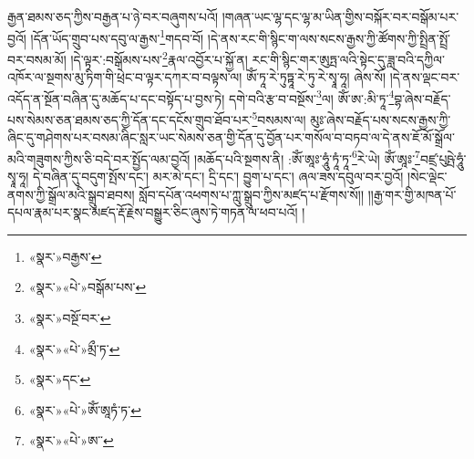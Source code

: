 རྒྱན་ཐམས་ཅད་ཀྱིས་བརྒྱན་པ་ཉེ་བར་བཞུགས་པའོ། །གཞན་ཡང་ལྷ་དང་ལྷ་མ་ཡིན་གྱིས་བསྐོར་བར་བསྒོམ་པར་བྱའོ། །དོན་ཡོད་གྲུབ་པས་དབུ་ལ་རྒྱས་\footnote{«སྣར་»བརྒྱས་}གདབ་བོ། །དེ་ནས་རང་གི་སྙིང་ག་ལས་སངས་རྒྱས་ཀྱི་ཚོགས་ཀྱི་སྤྲིན་སྤྲོ་བར་བསམ་མོ། །དེ་ལྟར་:བསྒོམས་པས་\footnote{«སྣར་»«པེ་»བསྒོམ་པས་}རྣལ་འབྱོར་པ་སྐྱོ་ན། རང་གི་སྙིང་གར་ཨུཏྤ་ལའི་སྟེང་དུ་ཟླ་བའི་དཀྱིལ་འཁོར་ལ་སྔགས་མུ་ཏིག་གི་ཕྲེང་བ་ལྟར་དཀར་བ་བལྟས་ལ། ཨོཾ་ཏཱ་རེ་ཏུཏྟཱ་རེ་ཏུ་རེ་སྭཱ་ཧཱ། ཞེས་སོ། །དེ་ནས་ལྡང་བར་འདོད་ན་སྔོན་བཞིན་དུ་མཆོད་པ་དང་བསྟོད་པ་བྱས་ཏེ། དགེ་བའི་རྩ་བ་བསྔོས་\footnote{«སྣར་»བསྔོ་བར་}ལ། ཨོཾ་ཨ་:མི་ཏཱ་\footnote{«སྣར་»«པེ་»མྲྀ་ཏ་}བྷ་ཞེས་བརྗོད་པས་སེམས་ཅན་ཐམས་ཅད་ཀྱི་དོན་དང་དངོས་གྲུབ་ཐོབ་པར་\footnote{«སྣར་»དང་}བསམས་ལ། མུཿ་ཞེས་བརྗོད་པས་སངས་རྒྱས་ཀྱི་ཞིང་དུ་གཤེགས་པར་བསམ་ཞིང་སླར་ཡང་སེམས་ཅན་གྱི་དོན་དུ་བྱོན་པར་གསོལ་བ་བཏབ་ལ་དེ་ནས་ཇོ་མོ་སྒྲོལ་མའི་གཟུགས་ཀྱིས་ཅི་བདེ་བར་སྤྱོད་ལམ་བྱའོ། །མཆོད་པའི་སྔགས་ནི། :ཨོཾ་ཨཱཿ་ཧཱུཾ་ཏཱཾ་ཏཱ་\footnote{«སྣར་»«པེ་»ཨོཾ་ཨཱཏཾ་ཏ་}རེ་ཡེ། ཨོཾ་ཨཱཿ་\footnote{«སྣར་»«པེ་»ཨ་་}བཛྲ་པུཥྤེ་ཧཱུཾ་སྭཱ་ཧཱ། དེ་བཞིན་དུ་བདུག་སྤོས་དང་། མར་མེ་དང་། དྲི་དང་། བྱུག་པ་དང་། ཞལ་ཟས་དབུལ་བར་བྱའོ། །སེང་ལྡེང་ནགས་ཀྱི་སྒྲོལ་མའི་སྒྲུབ་ཐབས། སློབ་དཔོན་འཕགས་པ་ཀླུ་སྒྲུབ་ཀྱིས་མཛད་པ་རྫོགས་སོ།། །།རྒྱ་གར་གྱི་མཁན་པོ་དཔལ་རྣམ་པར་སྣང་མཛད་རྡོ་རྗེས་བསྒྱུར་ཅིང་ཞུས་ཏེ་གཏན་ལ་ཕབ་པའོ། ། 